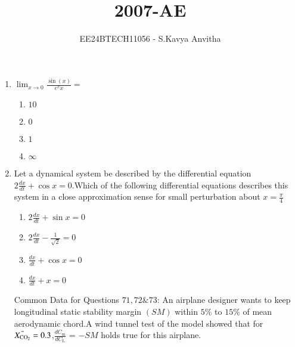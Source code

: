 \documentclass[journal]{IEEEtran}
\begin{document}

\vspace{3cm}

\title{2007-AE}
\author{EE24BTECH11056 - S.Kavya Anvitha}
\maketitle
\bigskip

\renewcommand{\thefigure}{\theenumi}
\renewcommand{\thetable}{\theenumi}
\begin{enumerate}
\item $\lim_{x \to 0} \frac{\sin(x)}{e^xx} = $
\begin{enumerate}
    \item $10$
    \item $0$
    \item $1$
    \item $\infty$\\
\end{enumerate}
\item Let a dynamical system be described by the differential equation $2\frac{dx}{dt} + \cos{x} = 0$.Which of the following differential equations describes this system in a close approximation sense for small perturbation about $x = \frac{\pi}{4}$
\begin{enumerate}
    \item $2\frac{dx}{dt} + \sin{x} = 0$
    \item $2\frac{dx}{dt} - \frac{1}{\sqrt{2}} = 0$
    \item $\frac{dx}{dt} + \cos{x} = 0$
    \item $\frac{dx}{dt} + x = 0$\\
\end{enumerate}

Common Data for Questions $71, 72 \& 73$: An airplane designer wants to keep longitudinal static stability margin $(SM)$ within $5\%$ to $15\%$ of mean  aerodynamic chord.A wind tunnel test of the model showed that for $\Bar{X_{\text{CO}_2}} = 0.3$,$\frac{dC_{\text{m}}}{dC_{\text{L}}}$ = $-SM$ holds true for this airplane.\\


\end{enumerate}
\end{document}
